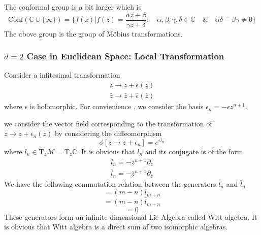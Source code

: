 \documentclass[a4paper,11pt]{article}
\begin{document}
The conformal group is a bit larger which is 
\begin{equation}
    \mathrm{Conf}(\mathbb{C}\cup\{\infty\})=\{f(z)|f(z)=\frac{\alpha z+\beta}{\gamma z+\delta};\quad\alpha,\beta,\gamma,\delta\in\mathbb{C}\quad\&\quad\alpha\delta-\beta\gamma\neq0\}
\end{equation}
The above group is the group of Möbius transformations.

\subsubsection{$d=2$ Case in Euclidean Space: Local Transformation}
Consider a infitesimal transformation
\begin{equation}
\begin{aligned}
z\rightarrow z+\epsilon(z)\\
\bar{z}\rightarrow \bar{z}+\bar{\epsilon}(\bar{z})
\end{aligned}
\end{equation}
where $\epsilon$ is holomorphic. For convienience , we consider the basis $\epsilon_n=-\epsilon z^{n+1}$. 

we consider the vector field corresponding to the transformation of $z\rightarrow z+\epsilon_n(z)$ by considering the diffeomorphism
\begin{equation}
    \phi[z\rightarrow z+\epsilon_n]=e^{\epsilon l_n}
\end{equation}
where $l_n\in\mathrm{T}_z\mathcal{M}=\mathrm{T}_z\mathbb{C}$. It is obvious that $l_n$ and its conjugate is of the form
\begin{equation}
\begin{aligned}
l_n=-z^{n+1}\partial_z\\
\bar{l}_n=-\bar{z}^{n+1}\partial_{\bar{z}}
\end{aligned}
\end{equation}
We have the following commutation relation between the generators $l_n$ and $\bar{l}_n$
\begin{equation}
[l_n,l_m]=(m-n)l_{m+n}
\end{equation}
\begin{equation}
    [\bar{l}_n,\bar{l}_m]=(m-n)\bar{l}_{m+n}
\end{equation}
\begin{equation}
    [\bar{l}_m,l_n]=0
\end{equation}
These generators form an infinite dimensional Lie Algebra called Witt algebra. It is obvious that Witt algebra is a direct sum of two isomorphic algebras.
\end{document}

